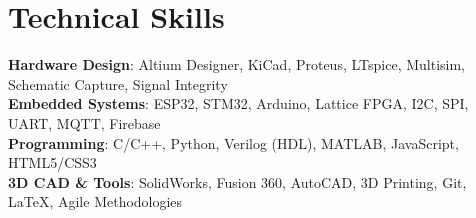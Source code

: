 \documentclass[letterpaper,10pt]{article}
\begin{document}
\section{Technical Skills}
  \begin{itemize}[leftmargin=0.15in, label={}]
    \small{\item{
      \textbf{Hardware Design}{: Altium Designer, KiCad, Proteus, LTspice, Multisim, Schematic Capture, Signal Integrity} \\
      \textbf{Embedded Systems}{: ESP32, STM32, Arduino, Lattice FPGA, I2C, SPI, UART, MQTT, Firebase} \\
      \textbf{Programming}{: C/C++, Python, Verilog (HDL), MATLAB, JavaScript, HTML5/CSS3} \\
      \textbf{3D CAD \& Tools}{: SolidWorks, Fusion 360, AutoCAD, 3D Printing, Git, LaTeX, Agile Methodologies}
    }}
  \end{itemize}
\end{document}
